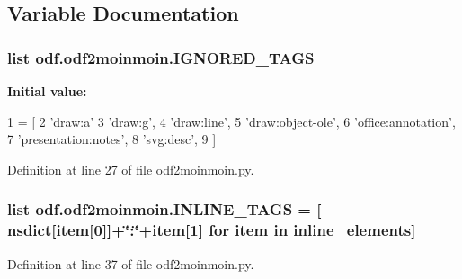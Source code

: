 \subsection{Variable Documentation}
\hypertarget{namespaceodf_1_1odf2moinmoin_ae790cd24a0f06d818d0244c39006f0c4}{
\subsubsection[{I\+G\+N\+O\+R\+E\+D\+\_\+\+T\+A\+G\+S}]{\setlength{\rightskip}{0pt plus 5cm}list odf.\+odf2moinmoin.\+I\+G\+N\+O\+R\+E\+D\+\_\+\+T\+A\+G\+S}}\label{namespaceodf_1_1odf2moinmoin_ae790cd24a0f06d818d0244c39006f0c4}
{\bfseries Initial value\+:}
\begin{DoxyCode}
1 = [
2     \textcolor{stringliteral}{'draw:a'}
3     \textcolor{stringliteral}{'draw:g'},
4     \textcolor{stringliteral}{'draw:line'},
5     \textcolor{stringliteral}{'draw:object-ole'},
6     \textcolor{stringliteral}{'office:annotation'},
7     \textcolor{stringliteral}{'presentation:notes'},
8     \textcolor{stringliteral}{'svg:desc'},
9 ]
\end{DoxyCode}


Definition at line 27 of file odf2moinmoin.\+py.

\hypertarget{namespaceodf_1_1odf2moinmoin_a0289a4d7cb05f857a7b043eacdbc4fcf}{
\subsubsection[{I\+N\+L\+I\+N\+E\+\_\+\+T\+A\+G\+S}]{\setlength{\rightskip}{0pt plus 5cm}list odf.\+odf2moinmoin.\+I\+N\+L\+I\+N\+E\+\_\+\+T\+A\+G\+S = \mbox{[} nsdict\mbox{[}item\mbox{[}0\mbox{]}\mbox{]}+\char`\"{}\+:\char`\"{}+item\mbox{[}1\mbox{]} for item in inline\+\_\+elements\mbox{]}}}\label{namespaceodf_1_1odf2moinmoin_a0289a4d7cb05f857a7b043eacdbc4fcf}


Definition at line 37 of file odf2moinmoin.\+py.

